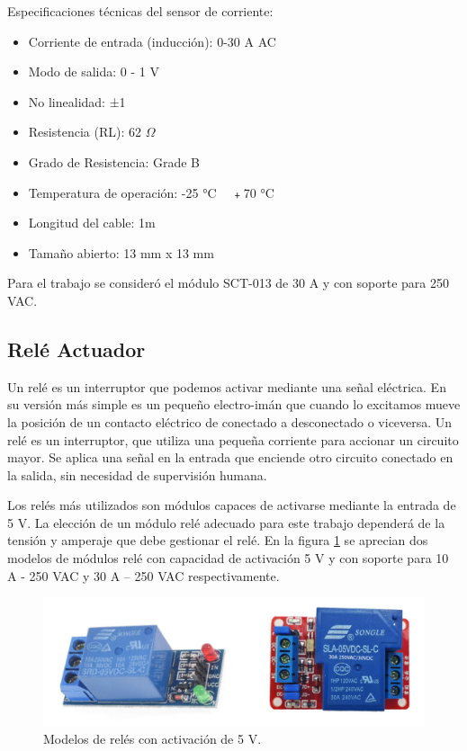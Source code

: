 Especificaciones técnicas del sensor de corriente:

\begin{itemize}
\item Corriente de entrada (inducción): 0-30 A AC
\item Modo de salida: 0 - 1 V
\item No linealidad: ±1%
\item Resistencia (RL): 62 $\Omega $
\item Grado de Resistencia: Grade B
\item Temperatura de operación: -25 °C ~ ﹢70 °C
\item Longitud del cable: 1m
\item Tamaño abierto: 13 mm x 13 mm
\end{itemize}

Para el trabajo se consideró el módulo SCT-013 de 30 A y con soporte para 250 VAC.

\subsection{Relé Actuador}

Un relé es un interruptor que podemos activar mediante una señal eléctrica. En su versión más simple es un pequeño electro-imán que cuando lo excitamos mueve la posición de un contacto eléctrico de conectado a desconectado o viceversa. Un relé es un interruptor, que utiliza una pequeña corriente para accionar un circuito mayor. Se aplica una señal en la entrada que enciende otro circuito conectado en la salida, sin necesidad de supervisión humana.

Los relés más utilizados son módulos capaces de activarse mediante la entrada de 5 V. La elección de un módulo relé adecuado para este trabajo dependerá de la tensión y amperaje que debe gestionar el relé. En la figura \ref{fig:rele} se aprecian dos modelos de módulos relé con capacidad de activación 5 V y con soporte para 10 A - 250 VAC y 30 A – 250 VAC respectivamente.


\begin{figure}[htbp]
	\centering
	\includegraphics[width=1.0\textwidth]{./Figures/rele.jpg}
	\caption{Modelos de relés con activación de 5 V.}

	\label{fig:rele}
\end{figure}

